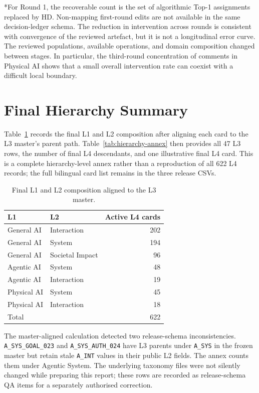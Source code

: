 \documentclass[10pt,a4paper]{article}
\begin{document}
*For Round 1, the recoverable count is the set of algorithmic Top-1 assignments replaced by HD. Non-mapping first-round edits are not available in the same decision-ledger schema. The reduction in intervention across rounds is consistent with convergence of the reviewed artefact, but it is not a longitudinal error curve. The reviewed populations, available operations, and domain composition changed between stages. In particular, the third-round concentration of comments in Physical AI shows that a small overall intervention rate can coexist with a difficult local boundary.

\section{Final Hierarchy Summary}

Table~\ref{tab:final-l2} records the final L1 and L2 composition after aligning each card to the L3 master's parent path. Table~\ref{tab:hierarchy-annex} then provides all 47 L3 rows, the number of final L4 descendants, and one illustrative final L4 card. This is a complete hierarchy-level annex rather than a reproduction of all 622 L4 records; the full bilingual card list remains in the three release CSVs.

\begin{table}[H]
\centering
\caption{Final L1 and L2 composition aligned to the L3 master.}
\label{tab:final-l2}
\begin{tabular}{llr}
\toprule
L1 & L2 & Active L4 cards \\
\midrule
General AI & Interaction & 202 \\
General AI & System & 194 \\
General AI & Societal Impact & 96 \\
Agentic AI & System & 48 \\
Agentic AI & Interaction & 19 \\
Physical AI & System & 45 \\
Physical AI & Interaction & 18 \\
\midrule
Total & & 622 \\
\bottomrule
\end{tabular}
\end{table}

The master-aligned calculation detected two release-schema inconsistencies. \nolinkurl{A_SYS_GOAL_023} and \nolinkurl{A_SYS_AUTH_024} have L3 parents under \nolinkurl{A_SYS} in the frozen master but retain stale \nolinkurl{A_INT} values in their public L2 fields. The annex counts them under Agentic System. The underlying taxonomy files were not silently changed while preparing this report; these rows are recorded as release-schema QA items for a separately authorised correction.

{\footnotesize

}

\begingroup
\small


\endgroup
\end{document}
